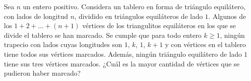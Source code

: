 Sea $n$ un entero positivo. Considera un tablero en forma de triángulo equilátero, con lados de longitud $n$, dividido en triángulos equiláteros de lado $1$. Algunos de los $1+2+\dots+(n+1)$ vértices de los triangulitos equiláteros en los que se divide el tablero se han marcado. Se cumple que para todo entero $k\geq 1$, ningún trapecio con lados cuyas longitudes son $1$, $k$, $1$, $k+1$ y con vértices en el tablero tiene todos sus vértices marcados. Además, ningún triángulo equilátero de lado $1$ tiene sus tres vértices marcados. ¿Cuál es la mayor cantidad de vértices que se pudieron haber marcado?